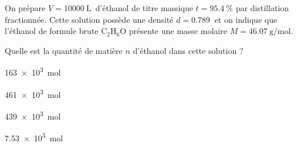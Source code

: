 
\finEntrainement



\hauteurLargeurCadreReponse		{7mm}{3cm}
\initialisationEntrainement

\debutEntrainement

On prépare $V=\SI{10000}{\liter}$ d'éthanol de titre massique $t=\SI{95,4}{\percent}$ par distillation fractionnée. Cette solution possède une densité $d=\SI{0,789}{}$ et on indique que l'éthanol de formule brute $\textrm{C}_2\textrm{H}_6\textrm{O}$ présente une masse molaire $M=\SI{46,07}{\gram\per\mol}$.




\begin{enonce}
	Quelle est la quantité de matière $n$ d'éthanol dans cette solution ?
	
	\begin{listeQCM1Colonne}
	\item \SI{163e3}{\mole}
	\item \SI{461e3}{\mole}
	\item \SI{439e3}{\mole}
	\item \SI{7,53e3}{\mole}
	\end{listeQCM1Colonne}
		
\end{enonce}

